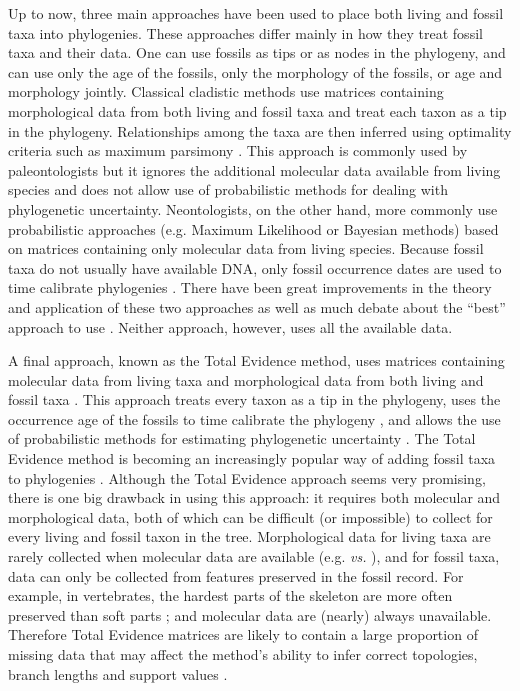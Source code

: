 Up to now, three main approaches have been used to place both living and fossil taxa into phylogenies.
These approaches differ mainly in how they treat fossil taxa and their data.
One can use fossils as tips or as nodes in the phylogeny, and can use only the age of the fossils, only the morphology of the fossils, or age and morphology jointly.
Classical cladistic methods use matrices containing morphological data from both living and fossil taxa and treat each taxon as a tip in the phylogeny. Relationships among the taxa are then inferred using optimality criteria such as maximum parsimony \citep{Hennig1966,felsenstein2004}.
This approach is commonly used by paleontologists but it ignores the additional molecular data available from living species and does not allow use of probabilistic methods for dealing with phylogenetic uncertainty.
Neontologists, on the other hand, more commonly use probabilistic approaches (e.g. Maximum Likelihood or Bayesian methods) based on matrices containing only molecular data from living species.
Because fossil taxa do not usually have available DNA, only fossil occurrence dates are used to time calibrate phylogenies \citep{zuckerkandl1965}.
There have been great improvements in the theory and application of these two approaches \citep[e.g.][]{bapsta2013,stadlerdating2013,heaththe2013} as well as much debate about the ``best'' approach to use \citep[e.g.][]{spencerefficacy2013,wrightbayesian2014}.
Neither approach, however, uses all the available data.

A final approach, known as the Total Evidence method, uses matrices containing molecular data from living taxa and morphological data from both living and fossil taxa \citep{eernissetaxonomic1993}.
This approach treats every taxon as a tip in the phylogeny, uses the occurrence age of the fossils to time calibrate the phylogeny \citep[known as tip-dating;][]{ronquista2012}, and allows the use of probabilistic methods for estimating phylogenetic uncertainty \citep{ronquista2012}.
The Total Evidence method is becoming an increasingly popular way of adding fossil taxa to phylogenies \citep[e.g.][]{pyrondivergence2011,ronquista2012,schragocombining2013,slaterphylogenetic2013,beckancient2014,Arcila2015131}.
Although the Total Evidence approach seems very promising, there is one big drawback in using this approach: it requires both molecular and morphological data, both of which can be difficult (or impossible) to collect for every living and fossil taxon in the tree.
Morphological data for living taxa are rarely collected when molecular data are available (e.g. \citealp{O'Leary08022013} \textit{vs.} \citealp{meredithimpacts2011}), and for fossil taxa, data can only be collected from features preserved in the fossil record.
For example, in vertebrates, the hardest parts of the skeleton are more often preserved than soft parts \citep{sansomfossilization2013}; and molecular data are (nearly) always unavailable.
Therefore Total Evidence matrices are likely to contain a large proportion of missing data that may affect the method's ability to infer correct topologies, branch lengths and support values \citep{salamin2003}. 

